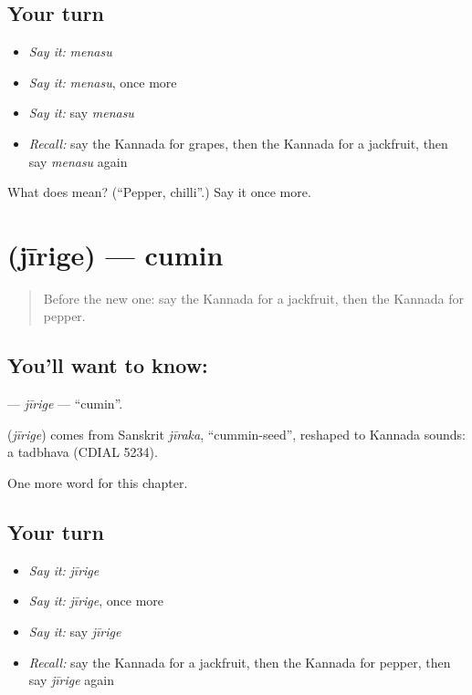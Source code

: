 \subsection*{Your turn}
\begin{itemize}
\raggedright
  \item \emph{Say it:} \emph{menasu}
  \item \emph{Say it:} \emph{menasu}, once more
  \item \emph{Say it:} say \emph{menasu}
  \item \emph{Recall:} say the Kannada for grapes, then the Kannada for a jackfruit, then say \emph{menasu} again
\end{itemize}

\begin{tcolorbox}[breakable,colback=teal!4,colframe=teal!35!black,title={Before you move on}]
What does  mean? (\textquotedblleft{}Pepper, chilli\textquotedblright{}.) Say it once more.
\end{tcolorbox}
\section[\texorpdfstring{\kn{ಜೀರಿಗೆ} (jīrige)}{ಜೀರಿಗೆ (jīrige)}]{ (jīrige) — cumin}

\label{lesson:KA-C126-jirige}



\begin{quote}
Before the new one: say the Kannada for a jackfruit, then the Kannada for pepper.
\end{quote}

\subsection*{You'll want to know: }
\textbf{} — \emph{jīrige} — \textquotedblleft{}cumin\textquotedblright{}.

\begin{cousinweb}
\textbf{} (\emph{jīrige}) comes from Sanskrit \emph{jīraka}, \textquotedblleft{}cummin-seed\textquotedblright{}, reshaped to Kannada sounds: a tadbhava (CDIAL 5234).
\end{cousinweb}

\begin{grammarlens}[title={What you've built}]
One more word for this chapter.
\end{grammarlens}

\subsection*{Your turn}
\begin{itemize}
\raggedright
  \item \emph{Say it:} \emph{jīrige}
  \item \emph{Say it:} \emph{jīrige}, once more
  \item \emph{Say it:} say \emph{jīrige}
  \item \emph{Recall:} say the Kannada for a jackfruit, then the Kannada for pepper, then say \emph{jīrige} again
\end{itemize}

